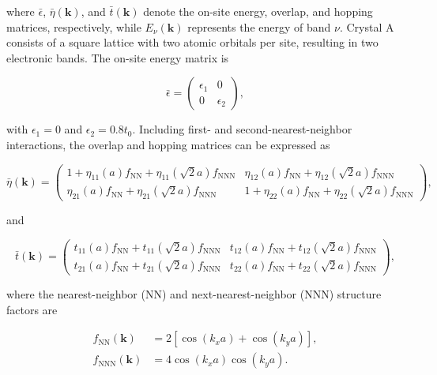 \documentclass[11pt]{article}
\begin{document}
where $\bar{\epsilon}$, $\bar{\eta}(\mathbf{k})$, and $\bar{t}(\mathbf{k})$ denote the on-site energy, overlap, and hopping matrices, respectively, while $E_{\nu}(\mathbf{k})$ represents the energy of band $\nu$. Crystal A consists of a square lattice with two atomic orbitals per site, resulting in two electronic bands. The on-site energy matrix is

\begin{equation}
\bar{\epsilon}
=
\begin{pmatrix}
\epsilon_1 & 0 \\
0 & \epsilon_2
\end{pmatrix},
\end{equation}

with $\epsilon_1=0$ and $\epsilon_2=0.8t_0$. Including first- and second-nearest-neighbor interactions, the overlap and hopping matrices can be expressed as

\begin{equation}
\label{eq:overlapA}
\bar{\eta}(\mathbf{k})
=
\begin{pmatrix}
1+\eta_{11}(a)f_{\mathrm{NN}}
+\eta_{11}(\sqrt{2}a)f_{\mathrm{NNN}}
&
\eta_{12}(a)f_{\mathrm{NN}}
+\eta_{12}(\sqrt{2}a)f_{\mathrm{NNN}}
\\
\eta_{21}(a)f_{\mathrm{NN}}
+\eta_{21}(\sqrt{2}a)f_{\mathrm{NNN}}
&
1+\eta_{22}(a)f_{\mathrm{NN}}
+\eta_{22}(\sqrt{2}a)f_{\mathrm{NNN}}
\end{pmatrix},
\end{equation}

and

\begin{equation}
\label{eq:hoppingA}
\bar{t}(\mathbf{k})
=
\begin{pmatrix}
t_{11}(a)f_{\mathrm{NN}}
+t_{11}(\sqrt{2}a)f_{\mathrm{NNN}}
&
t_{12}(a)f_{\mathrm{NN}}
+t_{12}(\sqrt{2}a)f_{\mathrm{NNN}}
\\
t_{21}(a)f_{\mathrm{NN}}
+t_{21}(\sqrt{2}a)f_{\mathrm{NNN}}
&
t_{22}(a)f_{\mathrm{NN}}
+t_{22}(\sqrt{2}a)f_{\mathrm{NNN}}
\end{pmatrix},
\end{equation}

where the nearest-neighbor (NN) and next-nearest-neighbor (NNN) structure factors are

\begin{align}
f_{\mathrm{NN}}(\mathbf{k})
&=
2\left[
\cos(k_xa)+\cos(k_ya)
\right],
\\
f_{\mathrm{NNN}}(\mathbf{k})
&=
4\cos(k_xa)\cos(k_ya).
\end{align}
\end{document}
